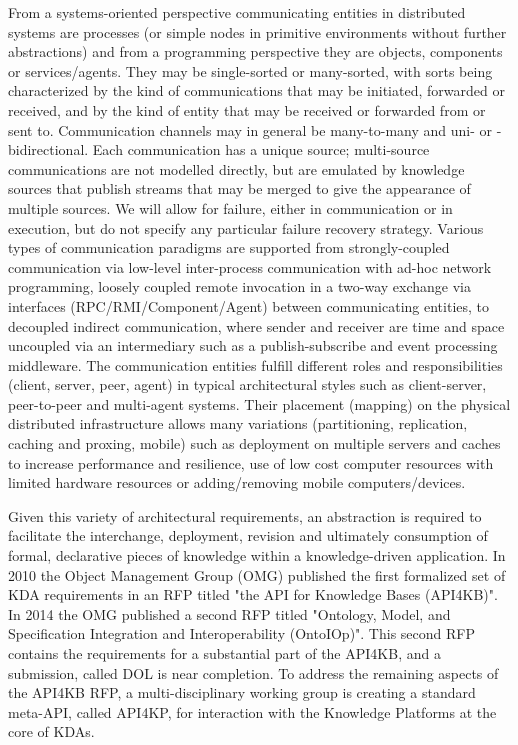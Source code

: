 \documentclass[runningheads]{llncs}
\begin{document}
From a systems-oriented perspective communicating entities in distributed systems are processes (or simple nodes in primitive environments without further abstractions) and from a programming perspective they are objects, components or services/agents. They may be single-sorted or many-sorted, with sorts being characterized by the kind of communications that may be initiated, forwarded or received, and by the kind of entity that may be received or forwarded from or sent to.
Communication channels may in general be many-to-many and uni- or -bidirectional. Each communication has a unique source; multi-source communications are not modelled directly, but are emulated by knowledge sources that publish streams that may be merged to give the appearance of multiple sources. We will allow for failure, either in communication or in execution, but do not specify any particular failure recovery strategy. 
Various types of communication paradigms are supported from strongly-coupled communication via low-level inter-process communication with ad-hoc network programming, loosely coupled remote invocation in a two-way exchange via interfaces  (RPC/RMI/Component/Agent)
between communicating entities, to decoupled indirect communication, where sender and receiver are time and space uncoupled via an intermediary such as a publish-subscribe and event processing middleware.
The communication entities fulfill different roles and responsibilities (client, server, peer, agent) in typical architectural styles such as client-server, peer-to-peer and multi-agent systems. Their placement (mapping) on the physical distributed infrastructure allows many variations (partitioning, replication, caching and proxing, mobile) such as deployment on multiple servers and caches to increase performance and resilience, use of low cost computer resources with limited hardware resources or adding/removing mobile computers/devices.

Given this variety of architectural requirements, an abstraction is required to facilitate the interchange, deployment, revision and ultimately consumption of formal, declarative pieces of knowledge within a knowledge-driven application. In 2010 the Object Management Group (OMG) published the first formalized set of KDA requirements in an RFP titled "the API for Knowledge Bases (API4KB)". In 2014 the OMG published a second RFP titled "Ontology, Model, and Specification Integration and Interoperability (OntoIOp)"\cite{OntoIOp}. This second RFP contains the requirements for a substantial part of the API4KB, and a submission, called DOL\cite{DOL} is near completion. To address the remaining aspects of the API4KB RFP, a multi-disciplinary working group is creating a standard meta-API, called API4KP, for interaction with the Knowledge Platforms at the core of KDAs. 
\end{document}
